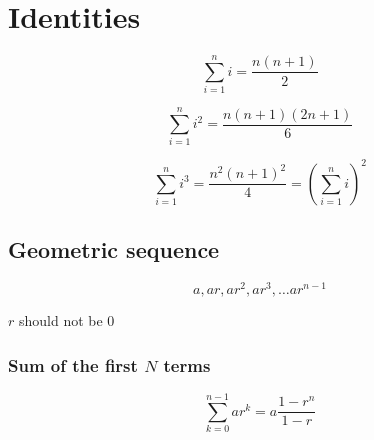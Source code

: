 \section{Identities}


$$ \sum_{i=1}^{n} i = \frac{n(n+1)}{2}  $$

$$\sum_{i=1}^{n} i^{2} = \frac{n(n+1)(2n+1)}{6}  $$

$$\sum_{i=1}^{n} i^{3} = \frac{n^{2}(n+1)^{2}}{4} = \left(\sum_{i=1}^n i\right)^2$$

\subsection{Geometric sequence}

\begin{equation}
  a, ar, ar^2, ar^3, \ldots ar^{n-1}
  \label{eq:Geometric sequence definition}
\end{equation}

$r$ should not be $0$

\subsubsection{Sum of the first $N$ terms}

\begin{equation}
  \sum_{k=0}^{n-1} ar^k =  a  \frac{1 - r^n}{1-r}
  \label{eq:Sum of the first N terms in a geometric sequence}
\end{equation}

